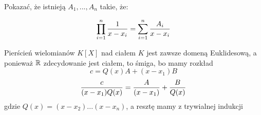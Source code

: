 \documentclass{article}
\author{Julia Walczuk, Weronika Jakimowicz}
\begin{document}
Pokazać, że istnieją $A_1,...,A_n$ takie, że:

$$\prod\limits_{i=1}^n{1\over x-x_i}=\sum\limits_{i=1}^n{A_i\over x-x_i}$$


Pierścień wielomianów $K[X]$ nad ciałem $K$ jest zawsze domeną Euklidesową, a ponieważ $\mathbb{R}$ zdecydowanie jest ciałem, to śmiga, bo mamy rozkład
$$c=Q(x)A+(x-x_1)B$$
$${c\over(x-x_1)Q(x)}={A\over (x-x_1)}+{B\over Q(x)}$$
gdzie $Q(x)=(x-x_2)...(x-x_n)$, a resztę mamy z trywialnej indukcji
\end{document}
